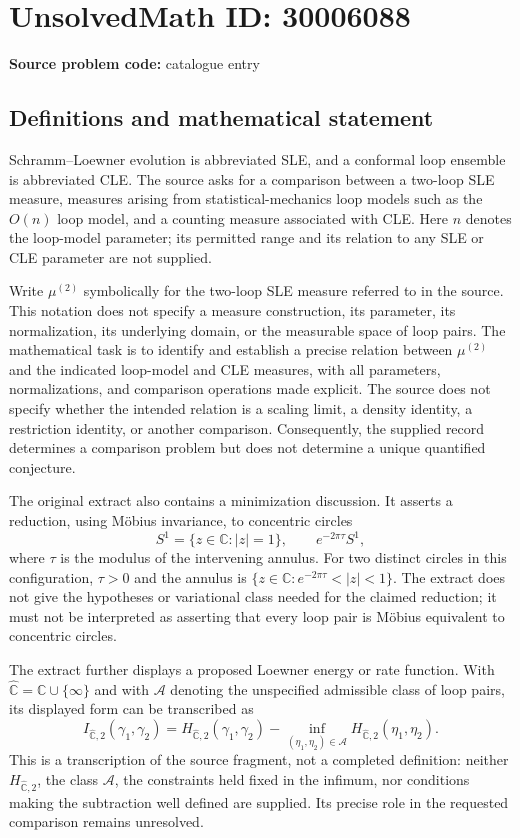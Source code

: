 \documentclass[11pt]{article}
\newcommand{\C}{\mathbb{C}}
\begin{document}
\section*{UnsolvedMath ID: 30006088}
\textbf{Source problem code:} catalogue entry
\subsection{Definitions and mathematical statement}
Schramm--Loewner evolution is abbreviated SLE, and a conformal loop ensemble is abbreviated CLE. The source asks for a comparison between a two-loop SLE measure, measures arising from statistical-mechanics loop models such as the \(O(n)\) loop model, and a counting measure associated with CLE. Here \(n\) denotes the loop-model parameter; its permitted range and its relation to any SLE or CLE parameter are not supplied.

Write \(\mu^{(2)}\) symbolically for the two-loop SLE measure referred to in the source. This notation does not specify a measure construction, its parameter, its normalization, its underlying domain, or the measurable space of loop pairs. The mathematical task is to identify and establish a precise relation between \(\mu^{(2)}\) and the indicated loop-model and CLE measures, with all parameters, normalizations, and comparison operations made explicit. The source does not specify whether the intended relation is a scaling limit, a density identity, a restriction identity, or another comparison. Consequently, the supplied record determines a comparison problem but does not determine a unique quantified conjecture.

The original extract also contains a minimization discussion. It asserts a reduction, using M\"obius invariance, to concentric circles
\[
S^1=\{z\in\C:|z|=1\},\qquad e^{-2\pi\tau}S^1,
\]
where \(\tau\) is the modulus of the intervening annulus. For two distinct circles in this configuration, \(\tau>0\) and the annulus is \(\{z\in\C:e^{-2\pi\tau}<|z|<1\}\). The extract does not give the hypotheses or variational class needed for the claimed reduction; it must not be interpreted as asserting that every loop pair is M\"obius equivalent to concentric circles.

The extract further displays a proposed Loewner energy or rate function. With \(\widehat{\C}=\C\cup\{\infty\}\) and with \(\mathcal A\) denoting the unspecified admissible class of loop pairs, its displayed form can be transcribed as
\[
I_{\widehat{\C},2}(\gamma_1,\gamma_2)
=
H_{\widehat{\C},2}(\gamma_1,\gamma_2)
-
\inf_{(\eta_1,\eta_2)\in\mathcal A}
H_{\widehat{\C},2}(\eta_1,\eta_2).
\]
This is a transcription of the source fragment, not a completed definition: neither \(H_{\widehat{\C},2}\), the class \(\mathcal A\), the constraints held fixed in the infimum, nor conditions making the subtraction well defined are supplied. Its precise role in the requested comparison remains unresolved.
\end{document}
